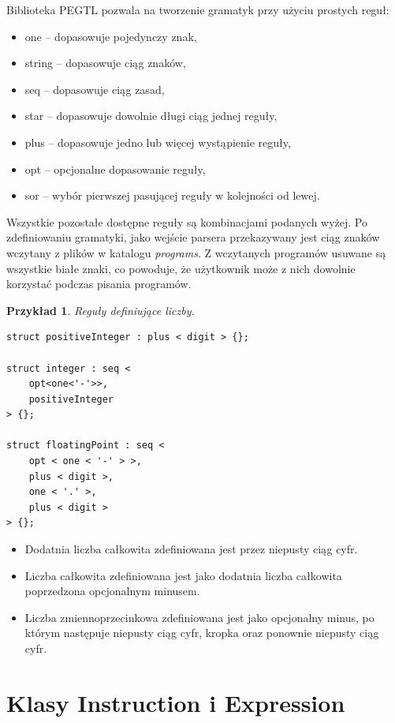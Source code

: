 \documentclass[declaration,shortabstract, inz]{iithesis}
\theoremstyle{definition} \newtheorem{definition}{Definicja}[]
\theoremstyle{plain} \newtheorem{remark}[definition]{Obserwacja}
\theoremstyle{plain} \newtheorem{theorem}[definition]{Twierdzenie}
\theoremstyle{plain} \newtheorem{example}{Przykład}[definition]
\theoremstyle{plain} \newtheorem{lemma}[definition]{Lemat}
\begin{document}
Biblioteka PEGTL pozwala na tworzenie gramatyk przy użyciu prostych reguł:
\begin{itemize}
\item one -- dopasowuje pojedynczy znak,
\item string -- dopasowuje ciąg znaków,
\item seq  -- dopasowuje ciąg zasad,
\item star -- dopasowuje dowolnie długi ciąg jednej reguły,
\item plus -- dopasowuje jedno lub więcej wystąpienie reguły,
\item opt  -- opcjonalne dopasowanie reguły,
\item sor -- wybór pierwszej pasującej reguły w kolejności od lewej.
\end{itemize}

Wszystkie pozostałe dostępne reguły są kombinacjami podanych wyżej. Po zdefiniowaniu gramatyki, jako wejście parsera przekazywany jest ciąg znaków wczytany z plików w katalogu \textit{programs}. Z wczytanych programów usuwane są wszystkie białe znaki, co powoduje, że użytkownik może z nich dowolnie korzystać podczas pisania programów.

\begin{example}
Reguły definiujące liczby.
\begin{center}
\begin{lstlisting}
struct positiveInteger : plus < digit > {};

struct integer : seq <
	opt<one<'-'>>,
	positiveInteger
> {};

struct floatingPoint : seq <
	opt < one < '-' > >,
	plus < digit >,
	one < '.' >,
	plus < digit >
> {};
\end{lstlisting}
\end{center}
\end{example}

\begin{itemize}
\item Dodatnia liczba całkowita zdefiniowana jest przez niepusty ciąg cyfr.
\item Liczba całkowita zdefiniowana jest jako dodatnia liczba całkowita poprzedzona opcjonalnym minusem.
\item Liczba zmiennoprzecinkowa zdefiniowana jest jako opcjonalny minus, po którym następuje niepusty ciąg cyfr, kropka oraz ponownie niepusty ciąg cyfr.
\end{itemize}

\section{Klasy Instruction i Expression}
\end{document}
